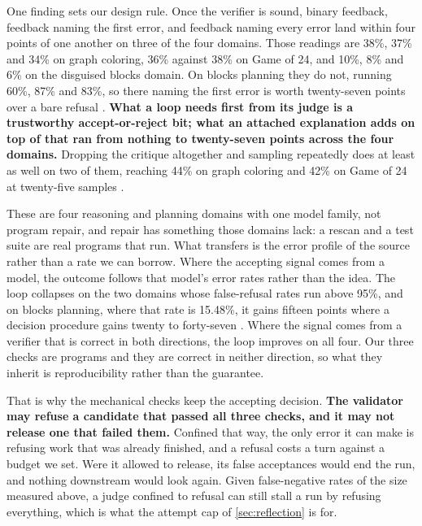One finding sets our design rule. Once the verifier is sound, binary feedback, feedback naming the
first error, and feedback naming every error land within four points of one another on three of the
four domains. Those readings are 38\%, 37\% and 34\% on graph coloring, 36\% against 38\% on Game of
24, and 10\%, 8\% and 6\% on the disguised blocks domain. On blocks planning they do not, running 60\%, 87\% and
83\%, so there naming the first error is worth twenty-seven points over a bare refusal
\citep[Table~1]{stechly2025selfverification}. \textbf{What a loop needs first from its judge is a
trustworthy accept-or-reject bit; what an attached explanation adds on top of that ran from nothing
to twenty-seven points across the four domains.} Dropping the critique altogether and sampling
repeatedly does at least as well on two of them, reaching 44\% on graph coloring and 42\% on Game of
24 at twenty-five samples \citep[Table~1]{stechly2025selfverification}.

These are four reasoning and planning domains with one model family, not program repair, and repair
has something those domains lack: a rescan and a test suite are real programs that run. What
transfers is the error profile of the source rather than a rate we can borrow. Where the accepting
signal comes from a model, the outcome follows that model's error rates rather than the idea. The
loop collapses on the two domains whose false-refusal rates run above 95\%, and on blocks planning, where that rate is
15.48\%, it gains fifteen points where a decision procedure gains twenty to forty-seven
\citep[Tables~1 and 2]{stechly2025selfverification}. Where the signal comes from a verifier that is
correct in both directions, the loop improves on all four. Our three checks are programs and they
are correct in neither direction, so what they inherit is reproducibility rather than the
guarantee.

That is why the mechanical checks keep the accepting decision. \textbf{The validator may refuse a candidate that
passed all three checks, and it may not release one that failed them.} Confined that way, the only
error it can make is refusing work that was already finished, and a refusal costs a turn against a
budget we set. Were it allowed to release, its false acceptances would end the run, and nothing
downstream would look again. Given false-negative rates of the size measured above, a judge confined
to refusal can still stall a run by refusing everything, which is what the attempt cap of
\cref{sec:reflection} is for.

